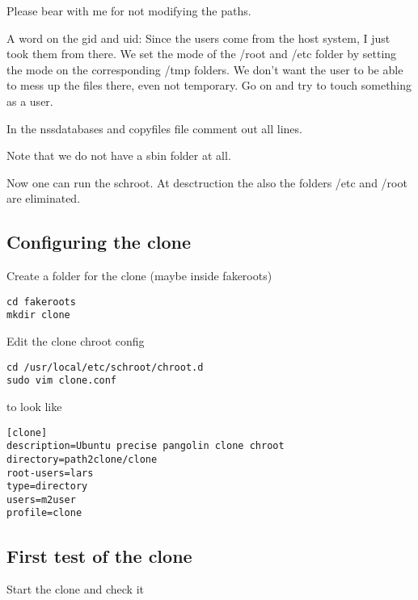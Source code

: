 \documentclass[a4paper]{book}
\begin{document}
Please bear with me for not modifying the paths.

A word on the gid and uid: Since the users come from the host system, I just
took them from there.  We set the mode of the /root and /etc folder by setting
the mode on the corresponding /tmp folders.  We don't want the user to be able
to mess up the files there, even not temporary. Go on and try to touch
something as a user.

In the nssdatabases and copyfiles file comment out all lines.

Note that we do not have a sbin folder at all.

Now one can run the schroot. At desctruction the also the folders /etc and
/root are eliminated.

\subsection{Configuring the clone}

Create a folder for the clone (maybe inside fakeroots)

\begin{verbatim}
cd fakeroots
mkdir clone
\end{verbatim}

Edit the clone chroot config

\begin{verbatim}
cd /usr/local/etc/schroot/chroot.d
sudo vim clone.conf
\end{verbatim}

to look like

\begin{verbatim}
[clone]
description=Ubuntu precise pangolin clone chroot
directory=path2clone/clone
root-users=lars
type=directory
users=m2user
profile=clone
\end{verbatim}

\subsection{First test of the clone}

Start the clone and check it
\end{document}
